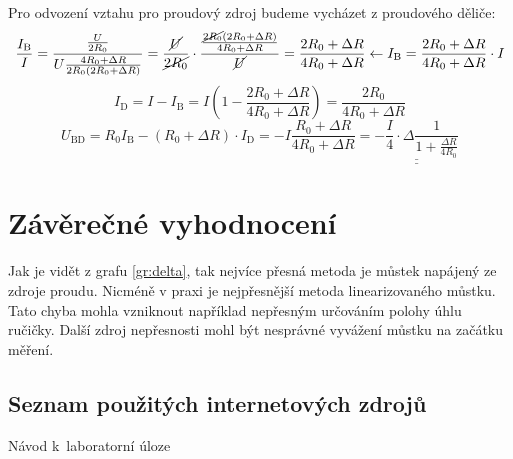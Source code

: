 \documentclass[a4paper,12pt]{article}   %
\begin{document}
Pro odvození vztahu pro proudový zdroj budeme vycházet z proudového děliče:
\begin{equation}
  \frac{I_\text{B}}{I} = \frac{\frac{U}{2R_0}}{U\frac{4R_0+\Delta R}{2R_0(2R_0 + \Delta R)}} = \frac{\cancel{U}}{\cancel{2R_0}}\cdot \frac{\frac{\cancel{2R_0}(2R_0 + \Delta R)}{{4R_0+\Delta R}}}{\cancel{U}} = \frac{2R_0+\Delta R}{4R_0 + \Delta R} \leftarrow I_\text{B} = {{\frac{2R_0+\Delta R}{4R_0 + \Delta R} \cdot I}}
\end{equation}
\begin{equation}
  I_\text{D} = I - I_\text{B} = I\left(1-\frac{2R_0+\Delta R}{4R_0 + \Delta R}\right) = {\frac{2R_0}{4R_0+\Delta R}}
\end{equation}
\begin{equation}
  U_\text{BD} = R_0 I_\text{B} -\left(R_0+\Delta R\right)\cdot I_\text{D} = -I\frac{R_0+\Delta R}{4R_0 + \Delta R} = \underline{\underline{-\frac{I}{4}\cdot\Delta \frac{1}{1+\frac{\Delta R}{4R_0}}}}
\end{equation}

\section{Závěrečné vyhodnocení}
Jak je vidět z grafu \ref{gr:delta}, tak nejvíce přesná metoda je můstek napájený ze zdroje proudu. Nicméně v praxi je nejpřesnější metoda linearizovaného můstku. Tato chyba mohla vzniknout například nepřesným určováním polohy úhlu ručičky. Další zdroj nepřesnosti mohl být nesprávné vyvážení můstku na začátku měření.

\clearpage
\renewcommand{\refname}{Seznam použité literatury a~zdrojů informací} 

\begin{thebibliography}{99}

\subsection*{Seznam použitých internetových zdrojů}
     Návod k~laboratorní úloze
    
\end{thebibliography}
\end{document}
